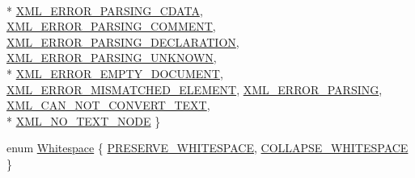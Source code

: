 \begin{DoxyCompactItemize}
\\*
\hyperlink{namespacetinyxml2_a1fbf88509c3ac88c09117b1947414e08a9d181628a1819f2b97835e6bc2c8bb3b}{X\-M\-L\-\_\-\-E\-R\-R\-O\-R\-\_\-\-P\-A\-R\-S\-I\-N\-G\-\_\-\-C\-D\-A\-T\-A}, 
\hyperlink{namespacetinyxml2_a1fbf88509c3ac88c09117b1947414e08a51786809e8b079c770853cf5890a7a35}{X\-M\-L\-\_\-\-E\-R\-R\-O\-R\-\_\-\-P\-A\-R\-S\-I\-N\-G\-\_\-\-C\-O\-M\-M\-E\-N\-T}, 
\hyperlink{namespacetinyxml2_a1fbf88509c3ac88c09117b1947414e08ad45b208578e30dab5a21bff1d8991b87}{X\-M\-L\-\_\-\-E\-R\-R\-O\-R\-\_\-\-P\-A\-R\-S\-I\-N\-G\-\_\-\-D\-E\-C\-L\-A\-R\-A\-T\-I\-O\-N}, 
\hyperlink{namespacetinyxml2_a1fbf88509c3ac88c09117b1947414e08a95a88813812a680fb7372f0149420a97}{X\-M\-L\-\_\-\-E\-R\-R\-O\-R\-\_\-\-P\-A\-R\-S\-I\-N\-G\-\_\-\-U\-N\-K\-N\-O\-W\-N}, 
\\*
\hyperlink{namespacetinyxml2_a1fbf88509c3ac88c09117b1947414e08a1a0478cf44f0a733aa6f21bdf0db80b5}{X\-M\-L\-\_\-\-E\-R\-R\-O\-R\-\_\-\-E\-M\-P\-T\-Y\-\_\-\-D\-O\-C\-U\-M\-E\-N\-T}, 
\hyperlink{namespacetinyxml2_a1fbf88509c3ac88c09117b1947414e08a0cecc816939d9155d33b8a88fd50e4c1}{X\-M\-L\-\_\-\-E\-R\-R\-O\-R\-\_\-\-M\-I\-S\-M\-A\-T\-C\-H\-E\-D\-\_\-\-E\-L\-E\-M\-E\-N\-T}, 
\hyperlink{namespacetinyxml2_a1fbf88509c3ac88c09117b1947414e08af6b4caa10e1f2e9f19a3a24f5f3ce223}{X\-M\-L\-\_\-\-E\-R\-R\-O\-R\-\_\-\-P\-A\-R\-S\-I\-N\-G}, 
\hyperlink{namespacetinyxml2_a1fbf88509c3ac88c09117b1947414e08afdb8840395a7c13dfe6a3e104401c095}{X\-M\-L\-\_\-\-C\-A\-N\-\_\-\-N\-O\-T\-\_\-\-C\-O\-N\-V\-E\-R\-T\-\_\-\-T\-E\-X\-T}, 
\\*
\hyperlink{namespacetinyxml2_a1fbf88509c3ac88c09117b1947414e08a5300bec98feccc8f0cdf567b88821f33}{X\-M\-L\-\_\-\-N\-O\-\_\-\-T\-E\-X\-T\-\_\-\-N\-O\-D\-E}
 \}
\item 
enum \hyperlink{namespacetinyxml2_a7f91d00f77360f850fd5da0861e27dd5}{Whitespace} \{ \hyperlink{namespacetinyxml2_a7f91d00f77360f850fd5da0861e27dd5a751769aa625fe5fe5286e9779edec56a}{P\-R\-E\-S\-E\-R\-V\-E\-\_\-\-W\-H\-I\-T\-E\-S\-P\-A\-C\-E}, 
\hyperlink{namespacetinyxml2_a7f91d00f77360f850fd5da0861e27dd5a9a4a309029a6f5e636e20ef5e0b65136}{C\-O\-L\-L\-A\-P\-S\-E\-\_\-\-W\-H\-I\-T\-E\-S\-P\-A\-C\-E}
 \}
\end{DoxyCompactItemize}


